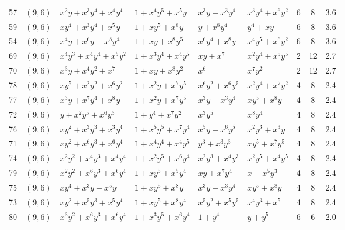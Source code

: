 \begin{table}[t]
\begin{tabular*}{\textwidth}{@{\extracolsep{\fill}}cllllllcc}
57 & $(9,6)$ & $x^{2}y{+}x^{3}y^{4}{+}x^{4}y^{4}$ & $1{+}x^{4}y^{5}{+}x^{5}y$ & $x^{3}y{+}x^{3}y^{4}$ & $x^{3}y^{4}{+}x^{6}y^{2}$ & 6 & 8 & 3.6 \\
59 & $(9,6)$ & $xy^{4}{+}x^{3}y^{4}{+}x^{5}y$ & $1{+}xy^{5}{+}x^{8}y$ & $y{+}x^{8}y^{4}$ & $y^{4}{+}xy$ & 6 & 8 & 3.6 \\
54 & $(9,6)$ & $x^{4}y{+}x^{6}y{+}x^{8}y^{4}$ & $1{+}xy{+}x^{8}y^{5}$ & $x^{6}y^{4}{+}x^{8}y$ & $x^{4}y^{5}{+}x^{6}y^{2}$ & 6 & 8 & 3.6 \\
69 & $(9,6)$ & $x^{4}y^{3}{+}x^{4}y^{4}{+}x^{5}y^{2}$ & $1{+}x^{3}y^{4}{+}x^{4}y^{5}$ & $xy{+}x^{7}$ & $x^{2}y^{4}{+}x^{5}y^{5}$ & 2 & 12 & 2.7 \\
70 & $(9,6)$ & $x^{3}y{+}x^{4}y^{2}{+}x^{7}$ & $1{+}xy{+}x^{8}y^{2}$ & $x^{6}$ & $x^{7}y^{2}$ & 2 & 12 & 2.7 \\
78 & $(9,6)$ & $xy^{5}{+}x^{2}y^{2}{+}x^{6}y^{2}$ & $1{+}x^{2}y{+}x^{7}y^{5}$ & $x^{6}y^{2}{+}x^{6}y^{5}$ & $x^{2}y^{4}{+}x^{7}y^{2}$ & 4 & 8 & 2.4 \\
77 & $(9,6)$ & $x^{3}y{+}x^{7}y^{4}{+}x^{8}y$ & $1{+}x^{2}y{+}x^{7}y^{5}$ & $x^{3}y{+}x^{3}y^{4}$ & $xy^{5}{+}x^{8}y$ & 4 & 8 & 2.4 \\
72 & $(9,6)$ & $y{+}x^{2}y^{5}{+}x^{6}y^{3}$ & $1{+}y^{4}{+}x^{7}y^{2}$ & $x^{3}y^{5}$ & $x^{8}y^{4}$ & 4 & 8 & 2.4 \\
76 & $(9,6)$ & $xy^{2}{+}x^{3}y^{3}{+}x^{3}y^{4}$ & $1{+}x^{5}y^{5}{+}x^{7}y^{4}$ & $x^{5}y{+}x^{6}y^{5}$ & $x^{2}y^{3}{+}x^{3}y$ & 4 & 8 & 2.4 \\
71 & $(9,6)$ & $xy^{2}{+}x^{6}y^{3}{+}x^{6}y^{4}$ & $1{+}x^{4}y^{4}{+}x^{4}y^{5}$ & $y^{3}{+}x^{3}y^{3}$ & $xy^{5}{+}x^{7}y^{5}$ & 4 & 8 & 2.4 \\
74 & $(9,6)$ & $x^{2}y^{2}{+}x^{4}y^{3}{+}x^{4}y^{4}$ & $1{+}x^{2}y^{5}{+}x^{6}y^{4}$ & $x^{2}y^{3}{+}x^{4}y^{3}$ & $x^{2}y^{5}{+}x^{4}y^{5}$ & 4 & 8 & 2.4 \\
79 & $(9,6)$ & $x^{2}y^{2}{+}x^{6}y^{3}{+}x^{6}y^{4}$ & $1{+}xy^{5}{+}x^{5}y^{4}$ & $xy{+}x^{7}y^{4}$ & $x{+}x^{5}y^{3}$ & 4 & 8 & 2.4 \\
75 & $(9,6)$ & $xy^{4}{+}x^{3}y{+}x^{5}y$ & $1{+}xy^{5}{+}x^{8}y$ & $x^{3}y{+}x^{3}y^{4}$ & $xy^{5}{+}x^{8}y$ & 4 & 8 & 2.4 \\
73 & $(9,6)$ & $xy^{2}{+}x^{5}y^{3}{+}x^{5}y^{4}$ & $1{+}xy^{5}{+}x^{8}y^{4}$ & $x^{5}y^{2}{+}x^{5}y^{5}$ & $x^{4}y^{3}{+}x^{5}$ & 4 & 8 & 2.4 \\
80 & $(9,6)$ & $x^{3}y^{2}{+}x^{6}y^{3}{+}x^{6}y^{4}$ & $1{+}x^{3}y^{5}{+}x^{6}y^{4}$ & $1{+}y^{4}$ & $y{+}y^{5}$ & 6 & 6 & 2.0 \\

\end{tabular*}
\end{table}
